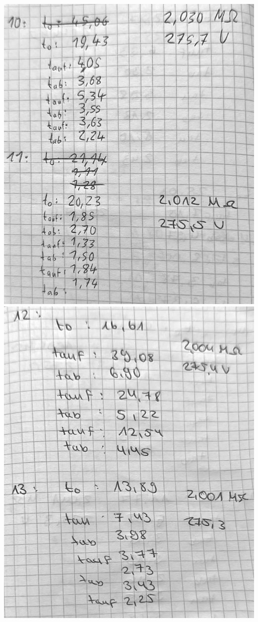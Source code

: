\null\vfill
\includegraphics[width=.75\linewidth]{content/messung/5.jpg}
\vfill\null
\newpage
\null\vfill
\includegraphics[width=.75\linewidth]{content/messung/6.jpg}
\vfill\null
\newpage
\null\vfill
